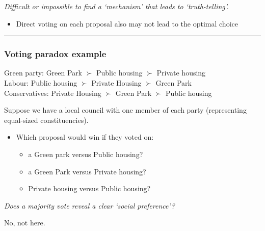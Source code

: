 \documentclass[]{article}
\providecommand{\tightlist}{%
  \setlength{\itemsep}{0pt}\setlength{\parskip}{0pt}}
\begin{document}
\bigskip

\emph{Difficult or impossible to find a `mechanism' that leads to
`truth-telling'.}

\begin{itemize}
\tightlist
\item
  Direct voting on each proposal also may not lead to the optimal choice
\end{itemize}

\begin{center}\rule{0.5\linewidth}{\linethickness}\end{center}

\hypertarget{voting-paradox-example}{%
\subsubsection{Voting paradox example}\label{voting-paradox-example}}

Green party: Green Park \(\succ\) Public housing \(\succ\) Private
housing\\

Labour: Public housing \(\succ\) Private Housing \(\succ\) Green Park\\

Conservatives: Private Housing \(\succ\) Green Park \(\succ\) Public
housing\\

\bigskip

Suppose we have a local council with one member of each party
(representing equal-sized constituencies).

\bigskip

\begin{itemize}
\tightlist
\item
  Which proposal would win if they voted on:

  \begin{itemize}
  \tightlist
  \item
    a Green park versus Public housing?
  \item
    a Green Park versus Private housing?
  \item
    Private housing versus Public housing?
  \end{itemize}
\end{itemize}

\bigskip

\emph{Does a majority vote reveal a clear `social preference'?}

\bigskip

No, not here.
\end{document}
